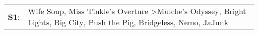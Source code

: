 \begin{supertabular}{p{0.03\textwidth}p{0.92\textwidth}}
 \textbf{S1}:  &  Wife Soup\textsuperscript{}, \enspace Miss Tinkle's Overture\textsuperscript{} \textgreater \enspace Mulche's Odyssey\textsuperscript{}, \enspace Bright Lights, Big City\textsuperscript{}, \enspace Push the Pig\textsuperscript{}, \enspace Bridgeless\textsuperscript{}, \enspace Nemo\textsuperscript{}, \enspace JaJunk\textsuperscript{}  \enspace  \\
\end{supertabular}
